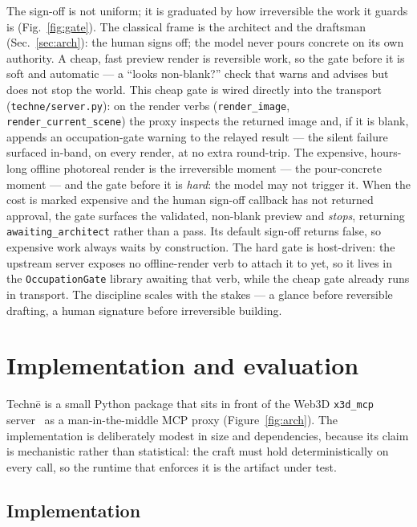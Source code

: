 \documentclass[sigconf,nonacm,screen,anonymous]{acmart}
\begin{document}
The sign-off is not uniform; it is graduated by how irreversible the work it guards is (Fig.~\ref{fig:gate}). The classical frame is the architect and the draftsman (Sec.~\ref{sec:arch}): the human signs off; the model never pours concrete on its own authority. A cheap, fast preview render is reversible work, so the gate before it is soft and automatic --- a ``looks non-blank?'' check that warns and advises but does not stop the world. This cheap gate is wired directly into the transport (\texttt{techne/server.py}): on the render verbs (\texttt{render\_image}, \texttt{render\_current\_scene}) the proxy inspects the returned image and, if it is blank, appends an occupation-gate warning to the relayed result --- the silent failure surfaced in-band, on every render, at no extra round-trip. The expensive, hours-long offline photoreal render is the irreversible moment --- the pour-concrete moment --- and the gate before it is \emph{hard}: the model may not trigger it. When the cost is marked expensive and the human sign-off callback has not returned approval, the gate surfaces the validated, non-blank preview and \emph{stops}, returning \texttt{awaiting\_architect} rather than a pass. Its default sign-off returns false, so expensive work always waits by construction. The hard gate is host-driven: the upstream server exposes no offline-render verb to attach it to yet, so it lives in the \texttt{OccupationGate} library awaiting that verb, while the cheap gate already runs in transport. The discipline scales with the stakes --- a glance before reversible drafting, a human signature before irreversible building.

\section{Implementation and evaluation}\label{sec:eval}

Techn\=e is a small Python package that sits in front of the Web3D \texttt{x3d\_mcp} server~\cite{x3dpy} as a man-in-the-middle MCP proxy (Figure~\ref{fig:arch}). The implementation is deliberately modest in size and dependencies, because its claim is mechanistic rather than statistical: the craft must hold deterministically on every call, so the runtime that enforces it is the artifact under test.

\subsection{Implementation}
\end{document}
